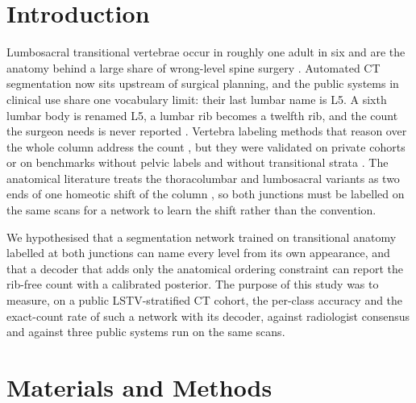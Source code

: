 \documentclass[12pt]{article}
\begin{document}
\section{Introduction}
Lumbosacral transitional vertebrae occur in roughly one adult in six and are the anatomy behind a large share of wrong-level spine surgery \citep{Konin2010LumbosacralRelevance,Carrino2011EffectImaging,Sekharappa2014LumbosacralSignificance}. Automated CT segmentation now sits upstream of surgical planning, and the public systems in clinical use share one vocabulary limit: their last lumbar name is L5. A sixth lumbar body is renamed L5, a lumbar rib becomes a twelfth rib, and the count the surgeon needs is never reported \citep{Wasserthal2023TotalSegmentator:Images}. Vertebra labeling methods that reason over the whole column address the count \citep{Moller2026VERIDAH:Sequences,Sekuboyina2020LabelingAnatomy}, but they were validated on private cohorts or on benchmarks without pelvic labels and without transitional strata \citep{Sekuboyina2021VerSe:Images}. The anatomical literature treats the thoracolumbar and lumbosacral variants as two ends of one homeotic shift of the column \citep{DuPlessis2018Homeotic,Poolman2023TransitionalVertebrae,Nagata2025RibLSTV}, so both junctions must be labelled on the same scans for a network to learn the shift rather than the convention.

We hypothesised that a segmentation network trained on transitional anatomy labelled at both junctions can name every level from its own appearance, and that a decoder that adds only the anatomical ordering constraint can report the rib-free count with a calibrated posterior. The purpose of this study was to measure, on a public LSTV-stratified CT cohort, the per-class accuracy and the exact-count rate of such a network with its decoder, against radiologist consensus and against three public systems run on the same scans.

\section{Materials and Methods}
\end{document}
